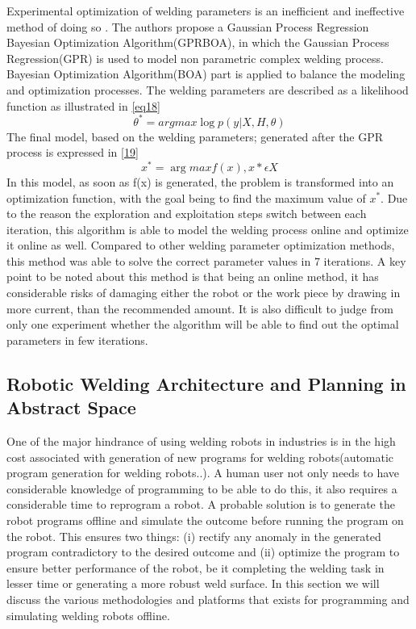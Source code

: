 Experimental optimization of welding parameters is an inefficient and ineffective method of doing so \cite{16}. The authors propose a Gaussian Process Regression Bayesian Optimization Algorithm(GPRBOA), in which the Gaussian Process Regression(GPR) is used to model non parametric complex welding process. Bayesian Optimization Algorithm(BOA) part is applied to balance the modeling and optimization processes. The welding parameters are described as a likelihood function as illustrated in \eqref{eq18}
\begin{equation}
\label{eq18}
\theta^{*} = argmax \log p(y|X,H,\theta)
\end{equation}
The final model, based on the welding parameters; generated after the GPR process is expressed in \eqref{19}
\begin{equation}
\label{eq19}
x^{*} = \arg max f(x), x* \epsilon X
\end{equation}
In this model, as soon as f(x) is generated, the problem is transformed into an optimization function, with the goal being to find the maximum value of $x^{*}$. Due to the reason the exploration and exploitation steps switch between each iteration, this algorithm is able to model the welding process online and optimize it online as well. Compared to other welding parameter optimization methods, this method was able to solve the correct parameter values in 7 iterations. A key point to be noted about this method is that being an online method, it has considerable risks of damaging either the robot or the work piece by drawing in more current, than the recommended amount. It is also difficult to judge from only one experiment whether the algorithm will be able to find out the optimal parameters in few iterations.
\newpage
\subsection{Robotic Welding Architecture and Planning in Abstract Space}
One of the major hindrance of using welding robots in industries is in the high cost associated with generation of new programs for welding robots\cite{14}(automatic program generation for welding robots..). A human user not only needs to have considerable knowledge of programming to be able to do this, it also requires a considerable time to reprogram a robot. A probable solution is to generate the robot programs offline and simulate the outcome before running the program on the robot. This ensures two things: (i) rectify any anomaly in the generated program contradictory to the desired outcome and (ii) optimize the program to ensure better performance of the robot, be it completing the welding task in lesser time or generating a more robust weld surface. In this section we  will discuss the various methodologies and platforms that exists for programming and simulating welding robots offline. 
